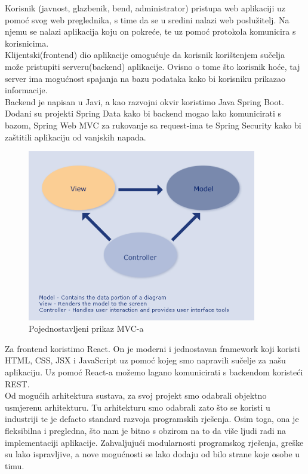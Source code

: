 	Korisnik (javnost, glazbenik, bend, administrator) pristupa web aplikaciji uz pomoć svog web preglednika, s time da se u sredini nalazi web poslužitelj. Na njemu se nalazi aplikacija koju on pokreće, te uz pomoć protokola komunicira s korisnicima.\\

	Klijentski(frontend) dio aplikacije omogućuje da korisnik korištenjem sučelja može pristupiti serveru(backend) aplikacije. Ovisno o tome što korisnik hoće, taj server ima mogućnost spajanja na bazu podataka kako bi korisniku prikazao informacije.\\

	Backend je napisan u Javi, a kao razvojni okvir koristimo Java Spring Boot. Dodani su projekti Spring Data kako bi backend mogao lako komunicirati s bazom, Spring Web MVC za rukovanje sa request-ima te Spring Security kako bi zaštitili aplikaciju od vanjskih napada. \\

	\begin{figure}[H]
		\begin{center}
			\includegraphics[width=10cm]{slike/mvc.PNG}
		\end{center}
		\caption{Pojednostavljeni prikaz MVC-a}
		\label{fig:mvc}
	\end{figure}

	Za frontend koristimo React. On je moderni i jednostavan framework koji koristi HTML, CSS, JSX i JavaScript uz pomoć kojeg smo napravili sučelje za našu aplikaciju. Uz pomoć React-a možemo lagano komunicirati s backendom koristeći REST.\\

	Od mogućih arhitektura sustava, za svoj projekt smo odabrali objektno usmjerenu arhitekturu. Tu arhitekturu smo odabrali zato što se koristi u industriji te je defacto standard razvoja programskih rješenja. Osim toga, ona je fleksibilna i pregledna, što nam je bitno s obzirom na to da više ljudi radi na implementaciji aplikacije. Zahvaljujući modularnosti programskog rješenja, greške su lako ispravljive, a nove mogućnosti se lako dodaju od bilo strane koje osobe u timu.\\


